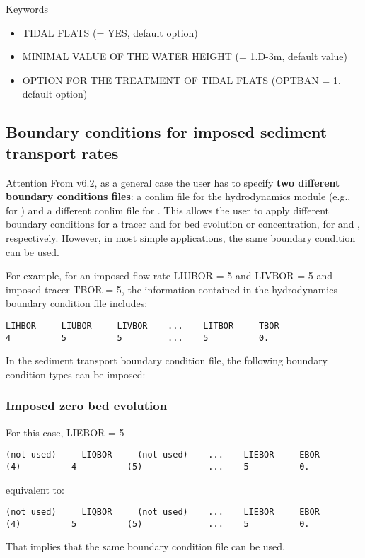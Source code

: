 \medskip
\begin{bclogo}[couleur=blue!10,arrondi=0.1, logo=\bcinfo]{Keywords}
\begin{itemize}
\item {\ttfamily TIDAL FLATS} ({\ttfamily = YES}, default option) 
\item {\ttfamily MINIMAL VALUE OF THE WATER HEIGHT} ({\ttfamily = 1.D-3}m, default value)
\item {\ttfamily OPTION FOR THE TREATMENT OF TIDAL FLATS} ({\ttfamily OPTBAN = 1}, default option)
\end{itemize}
\end{bclogo}


\subsection{Boundary conditions for imposed sediment transport rates}
\begin{bclogo}[couleur = blue!10, arrondi = 0.10, logo = \bcattention]{\textsf{Attention}}
From v6.2, as a general case the user has to specify \textbf{two different boundary conditions files}: a conlim file for the hydrodynamics module (e.g., for \teldd) and a different conlim file for \sisyphe. This allows the user to apply different boundary conditions for a tracer and for bed evolution or concentration, for \teldd and \sisyphe, respectively. However, in most simple applications, the same boundary condition can be used.
\end{bclogo}

For example, for an imposed flow rate {\ttfamily LIUBOR = 5} and {\ttfamily LIVBOR = 5} and imposed tracer {\ttfamily TBOR = 5}, the information contained in the hydrodynamics boundary condition file includes:
 \begin{verbatim}
LIHBOR     LIUBOR     LIVBOR    ...    LITBOR     TBOR
4          5          5         ...    5          0.         
\end{verbatim}

In the sediment transport boundary condition file, the following boundary condition types can be imposed:

\subsubsection{Imposed zero bed evolution}
For this case, {\ttfamily LIEBOR = 5}
 \begin{verbatim}
(not used)     LIQBOR     (not used)    ...    LIEBOR     EBOR
(4)          4          (5)             ...    5          0.         
\end{verbatim}
equivalent to:
 \begin{verbatim}
(not used)     LIQBOR     (not used)    ...    LIEBOR     EBOR
(4)          5          (5)             ...    5          0.         
\end{verbatim}
That implies that the same boundary condition file can be used.

